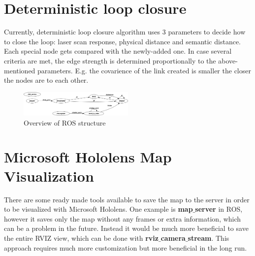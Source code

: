\documentclass[conference]{IEEEtran}
\begin{document}
\section{Deterministic loop closure}

Currently, deterministic loop closure algorithm uses 3 parameters to decide how to close the loop: laser scan response, physical distance and semantic distance. Each special node gets compared with the newly-added one. 
In case several criteria are met, the edge strength is determined proportionally to the above-mentioned parameters. E.g. the covarience of the link created is smaller the closer the nodes are to each other.

\begin{figure}[htbp]
    \centerline{\includegraphics[width=0.5\textwidth,height=\textheight,keepaspectratio]{Pictures/overview_ROS.png}}
    \caption{Overview of ROS structure}

    \label{ROS}

\end{figure}

\section{Microsoft Hololens Map Visualization}

There are some ready made tools available to save the map to the server in order to be visualized with Microsoft Hololens. One example is \textbf{map$\_$server} in ROS, however it saves only the map without any frames or extra information, which can be a problem in the future. Instead it would be much more beneficial to save the entire RVIZ view, which can be done with \textbf{rviz$\_$camera$\_$stream}. This approach requires much more customization but more beneficial in the long run. \cite{rhino}








\typeout{}

\end{document}
